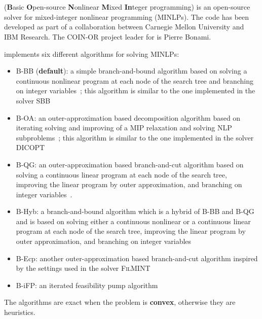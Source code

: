 \section{\BONMIN}


\BONMIN (\textbf{B}asic \textbf{O}pen-source \textbf{N}onlinear \textbf{M}ixed \textbf{In}teger programming) is an open-source solver for mixed-integer nonlinear programming (MINLPs).
The code has been developed as part of a collaboration between Carnegie Mellon University and IBM Research.
The COIN-OR project leader for \BONMIN is Pierre Bonami.

\BONMIN implements six different algorithms for solving MINLPs:
\begin{itemize}
\setlength{\partopsep}{0pt}
\setlength{\itemsep}{0pt}
\item {B-BB} (\textbf{default}): a simple branch-and-bound algorithm based on solving a continuous nonlinear program at each node of the search tree and branching on integer variables~\cite{GuptaRavindran85}; this algorithm is similar to the one implemented in the solver \textsc{SBB}
\item {B-OA}: an outer-approximation based decomposition algorithm based on iterating solving and improving of a MIP relaxation and solving NLP subproblems~\cite{DuGr86,FlLe94}; this algorithm is similar to the one implemented in the solver \textsc{DICOPT}
\item {B-QG}: an outer-approximation based branch-and-cut algorithm based on solving a continuous linear program at each node of the search tree, improving the linear program by outer approximation, and branching on integer variables~\cite{QeGr92}.
\item {B-Hyb}: a branch-and-bound algorithm which is a hybrid of B-BB and B-QG and is based on solving either a continuous nonlinear or a continuous linear program at each node of the search tree, improving the linear program by outer approximation, and branching on integer variables~\cite{BBCCGLLLMSW}
\item {B-Ecp}: another outer-approximation based branch-and-cut algorithm inspired by the settings used in the solver \textsc{FilMINT}~\cite{AbLeLi07}
\item {B-iFP}: an iterated feasibility pump algorithm~\cite{BoCoLoMa06}
\end{itemize}
The algorithms are exact when the problem is \textbf{convex}, otherwise they are heuristics.


